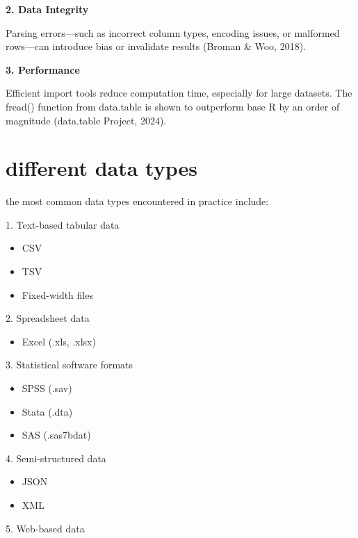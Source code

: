 \documentclass[
  doc,
  longtable,
  a4paper,
  nolmodern,
  notxfonts,
  notimes,
  colorlinks=true,linkcolor=blue,citecolor=blue,urlcolor=blue]{apa7}
\providecommand{\tightlist}{%
  \setlength{\itemsep}{0pt}\setlength{\parskip}{0pt}}
\begin{document}
\textbf{2. Data Integrity}

Parsing errors---such as incorrect column types, encoding issues, or
malformed rows---can introduce bias or invalidate results (Broman \&
Woo, 2018).

\textbf{3. Performance}

Efficient import tools reduce computation time, especially for large
datasets. The fread() function from data.table is shown to outperform
base R by an order of magnitude (data.table Project, 2024).

\section{different data types}\label{different-data-types}

the most common data types encountered in practice include:

1. Text-based tabular data

\begin{itemize}
\tightlist
\item
  CSV\\
\item
  TSV\\
\item
  Fixed-width files
\end{itemize}

2. Spreadsheet data

\begin{itemize}
\tightlist
\item
  Excel (.xls, .xlsx)
\end{itemize}

3. Statistical software formats

\begin{itemize}
\tightlist
\item
  SPSS (.sav)\\
\item
  Stata (.dta)\\
\item
  SAS (.sas7bdat)
\end{itemize}

4. Semi-structured data

\begin{itemize}
\tightlist
\item
  JSON\\
\item
  XML
\end{itemize}

5. Web-based data
\end{document}

